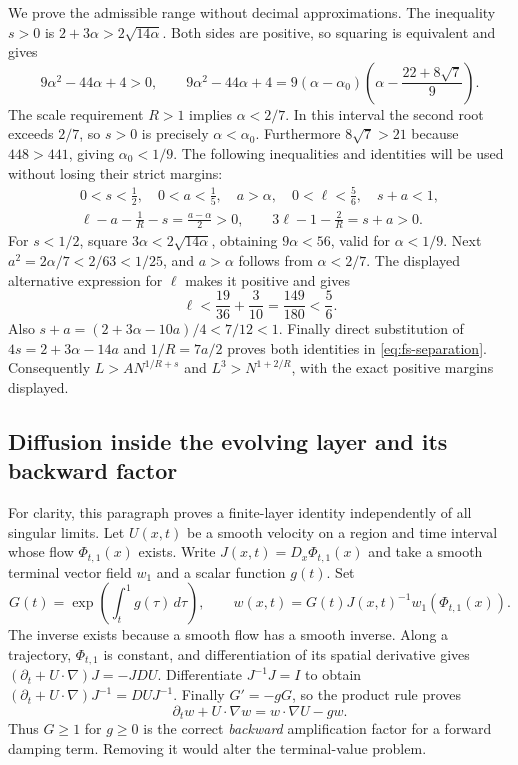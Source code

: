 We prove the admissible range without decimal approximations. The inequality
$s>0$ is $2+3\alpha>2\sqrt{14\alpha}$. Both sides are positive, so squaring is
equivalent and gives
\[
 9\alpha^2-44\alpha+4>0,
 \qquad
 9\alpha^2-44\alpha+4
 =9(\alpha-\alpha_0)
   \left(\alpha-\frac{22+8\sqrt7}{9}\right).
\]
The scale requirement $R>1$ implies $\alpha<2/7$. In this interval the second
root exceeds $2/7$, so $s>0$ is precisely $\alpha<\alpha_0$.
Furthermore $8\sqrt7>21$ because $448>441$, giving $\alpha_0<1/9$.
The following inequalities and identities will be used without losing their
strict margins:
\begin{gather}
 0<s<\frac12,\quad 0<a<\frac15,\quad a>\alpha,
 \quad 0<\ell<\frac56,\quad s+a<1,                 \label{eq:fs-margins}\\
 \ell-a-\frac1R-s=\frac{a-\alpha}{2}>0,\qquad
 3\ell-1-\frac2R=s+a>0.                           \label{eq:fs-separation}
\end{gather}
For $s<1/2$, square $3\alpha<2\sqrt{14\alpha}$, obtaining
$9\alpha<56$, valid for $\alpha<1/9$. Next
$a^2=2\alpha/7<2/63<1/25$, and $a>\alpha$ follows from
$\alpha<2/7$. The displayed alternative expression for $\ell$ makes it
positive and gives
\[
 \ell<\frac{19}{36}+\frac3{10}
 =\frac{149}{180}<\frac56.
\]
Also $s+a=(2+3\alpha-10a)/4<7/12<1$.
Finally direct substitution of $4s=2+3\alpha-14a$ and $1/R=7a/2$ proves both
identities in \eqref{eq:fs-separation}. Consequently
$L>AN^{1/R+s}$ and $L^3>N^{1+2/R}$, with the exact positive margins displayed.

\subsection{Diffusion inside the evolving layer and its backward factor}

For clarity, this paragraph proves a finite-layer identity independently of
all singular limits. Let $U(x,t)$ be a smooth velocity on a region and time
interval whose flow $\Phi_{t,1}(x)$ exists. Write
$J(x,t)=D_x\Phi_{t,1}(x)$ and take a smooth terminal vector field $w_1$ and a
scalar function $g(t)$. Set
\[
 G(t)=\exp\left(\int_t^1g(\tau)\,d\tau\right),\qquad
 w(x,t)=G(t)J(x,t)^{-1}w_1(\Phi_{t,1}(x)).        \tag{FS5}\label{eq:fs-flow}
\]
The inverse exists because a smooth flow has a smooth inverse. Along a
trajectory, $\Phi_{t,1}$ is constant, and differentiation of its spatial
derivative gives
$(\partial_t+U\cdot\nabla)J=-JDU$.
Differentiate $J^{-1}J=I$ to obtain
$(\partial_t+U\cdot\nabla)J^{-1}=DUJ^{-1}$.
Finally $G'=-gG$, so the product rule proves
\[
 \partial_tw+U\cdot\nabla w=w\cdot\nabla U-gw.
                                                        \tag{FS6}\label{eq:fs-damping}
\]
Thus $G\geq1$ for $g\geq0$ is the correct \emph{backward} amplification
factor for a forward damping term. Removing it would alter the terminal-value
problem.

